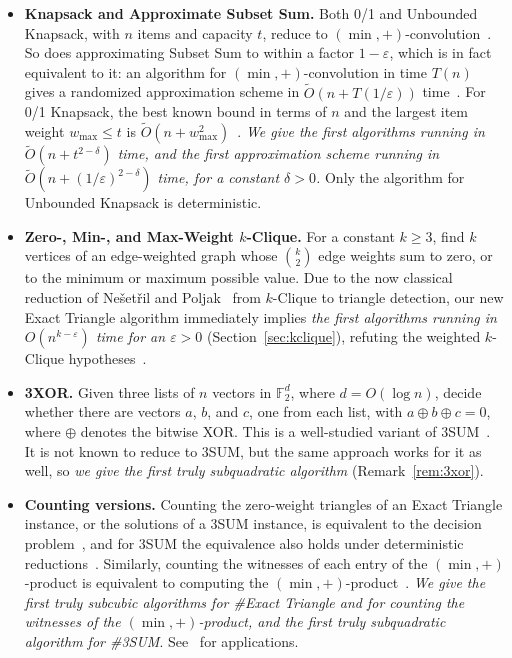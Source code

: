 \begin{itemize}
\item \textbf{Knapsack and Approximate Subset Sum.} Both 0/1 and Unbounded Knapsack, with $n$ items and capacity $t$, reduce to $(\min,+)$-convolution~\cite{CMWW19}. So does approximating Subset Sum to within a factor $1-\varepsilon$, which is in fact equivalent to it: an algorithm for $(\min,+)$-convolution in time $T(n)$ gives a randomized approximation scheme in $\tilde O(n+T(1/\varepsilon))$ time~\cite{BN21}. For 0/1 Knapsack, the best known bound in terms of $n$ and the largest item weight $w_{\max}\le t$ is $\tilde O(n+w_{\max}^2)$~\cite{Bri24,Jin24}. \emph{We give the first algorithms running in $\tilde O(n+t^{2-\delta})$ time, and the first approximation scheme running in $\tilde O(n+(1/\varepsilon)^{2-\delta})$ time, for a constant $\delta>0$.} Only the algorithm for Unbounded Knapsack is deterministic.

\item \textbf{Zero-, Min-, and Max-Weight $k$-Clique.} For a constant $k\ge3$, find $k$ vertices of an edge-weighted graph whose $\binom k2$ edge weights sum to zero, or to the minimum or maximum possible value. Due to the now classical reduction of Ne\v{s}et\v{r}il and Poljak~\cite{NP85} from $k$-Clique to triangle detection, our new Exact Triangle algorithm immediately implies \emph{the first algorithms running in $O(n^{k-\varepsilon})$ time for an $\varepsilon>0$} (Section~\ref{sec:kclique}), refuting the weighted $k$-Clique hypotheses~\cite{AL13,LVW18,BDT16}.

\item \textbf{3XOR.} Given three lists of $n$ vectors in $\mathbb F_2^{d}$, where $d=O(\log n)$, decide whether there are vectors $a$, $b$, and $c$, one from each list, with $a\oplus b\oplus c=0$, where $\oplus$ denotes the bitwise XOR. This is a well-studied variant of $3$SUM~\cite{JV16,DSW18}. It is not known to reduce to $3$SUM, but the same approach works for it as well, so \emph{we give the first truly subquadratic algorithm} (Remark~\ref{rem:3xor}).

\item \textbf{Counting versions.} Counting the zero-weight triangles of an Exact Triangle instance, or the solutions of a $3$SUM instance, is equivalent to the decision problem~\cite{CVX23}, and for $3$SUM the equivalence also holds under deterministic reductions~\cite{FJX25}. Similarly, counting the witnesses of each entry of the $(\min,+)$-product is equivalent to computing the $(\min,+)$-product~\cite{CVX23}. \emph{We give the first truly subcubic algorithms for \#Exact Triangle and for counting the witnesses of the $(\min,+)$-product, and the first truly subquadratic algorithm for \#3SUM}. See~\cite{CVX23,FJX25} for applications.
\end{itemize}

